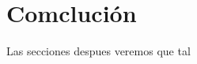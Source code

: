 \documentclass[%
 	final,
%
	notitlepage,
	narroweqnarray,
	inline,
 	twoside,
	]{ieee}
\begin{document}





\section{Comcluci\'on}
Las secciones despues veremos que tal
\end{document}
